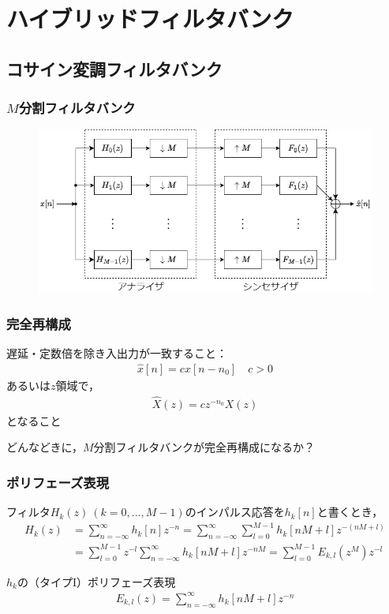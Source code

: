 \documentclass[17pt,xcolor=dvipsnames,table,dvipdfmx]{beamer}
\begin{document}
\section{ハイブリッドフィルタバンク}

\subsection{コサイン変調フィルタバンク}

\begin{frame}[c]
    \frametitle{$M$分割フィルタバンク}
    \begin{figure}
        \includegraphics[width=120mm]{./figs/filter_bank.drawio.png}
    \end{figure}
\end{frame}

\begin{frame}[c]
    \frametitle{完全再構成}
    遅延・定数倍を除き入出力が一致すること：
    \begin{align}
        \hat{x}[n] = c x[n - n_{0}] \quad c > 0
    \end{align}
    あるいは$z$領域で，
    \begin{align}
        \hat{X}(z) = c z^{-n_{0}} X(z)
    \end{align}
    となること
    \begin{block}{}
        どんなどきに，$M$分割フィルタバンクが完全再構成になるか？
    \end{block}
\end{frame}

\begin{frame}[c]
    \frametitle{ポリフェーズ表現}
    フィルタ$H_{k}(z)\ (k = 0,...,M-1)$のインパルス応答を$h_{k}[n]$と書くとき，
    \scriptsize
    \begin{align*}
        H_{k}(z) &= \sum_{n = -\infty}^{\infty} h_{k}[n] z^{-n} = \sum_{n = -\infty}^{\infty} \sum_{l = 0}^{M - 1} h_{k}[nM + l] z^{-(nM+l)} \\
        &= \sum_{l = 0}^{M - 1} z^{-l} \sum_{n = -\infty}^{\infty}h_{k}[nM + l] z^{-nM} = \sum_{l = 0}^{M - 1} E_{k,l}(z^{M}) z^{-l}
    \end{align*}
    \normalsize
    \begin{block}{$h_{k}$の（タイプI）ポリフェーズ表現}
        \vspace{-13pt}
        \begin{align}
            E_{k,l}(z) = \sum_{n = -\infty}^{\infty} h_{k}[nM + l] z^{-n} \label{eq:type1_polyphase_representation}
        \end{align}
    \end{block}
\end{frame}
\end{document}
